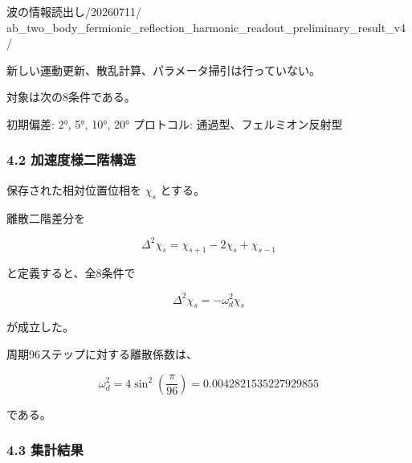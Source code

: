 \documentclass[
  a4paper,
]{ltjsarticle}
\newenvironment{Shaded}{}{}
\newcommand{\NormalTok}[1]{#1}
\begin{document}
\begin{Shaded}
\begin{Highlighting}[]
\NormalTok{波の情報読出し/20260711/}
\NormalTok{ab\_two\_body\_fermionic\_reflection\_harmonic\_readout\_preliminary\_result\_v4/}
\end{Highlighting}
\end{Shaded}

新しい運動更新、散乱計算、パラメータ掃引は行っていない。

対象は次の8条件である。

\begin{Shaded}
\begin{Highlighting}[]
\NormalTok{初期偏差: 2°, 5°, 10°, 20°}
\NormalTok{プロトコル: 通過型、フェルミオン反射型}
\end{Highlighting}
\end{Shaded}

\subsubsection{4.2
加速度様二階構造}\label{ux52a0ux901fux5ea6ux69d8ux4e8cux968eux69cbux9020}

保存された相対位置位相を \(\chi_s\) とする。

離散二階差分を

\[
\Delta^2\chi_s
=\chi_{s+1}-2\chi_s+\chi_{s-1}
\]

と定義すると、全8条件で

\[
\Delta^2\chi_s
=-\omega_d^2\chi_s
\]

が成立した。

周期96ステップに対する離散係数は、

\[
\omega_d^2
=4\sin^2\left(\frac{\pi}{96}\right)
=0.0042821535227929855
\]

である。

\subsubsection{4.3 集計結果}\label{ux96c6ux8a08ux7d50ux679c}
\end{document}
